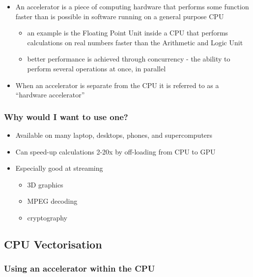 \begin{itemize}
\itemsep1pt\parskip0pt
\item
  An accelerator is a piece of computing hardware that performs some
  function faster than is possible in software running on a general
  purpose CPU

  \begin{itemize}
  \itemsep1pt\parskip0pt
  \item
    an example is the Floating Point Unit inside a CPU that performs
    calculations on real numbers faster than the Arithmetic and Logic
    Unit
  \item
    better performance is achieved through concurrency - the ability to
    perform several operations at once, in parallel
  \end{itemize}
\item
  When an accelerator is separate from the CPU it is referred to as a
  ``hardware accelerator''
\end{itemize}

\subsubsection{Why would I want to use
one?}\label{why-would-i-want-to-use-one}

\begin{itemize}
\itemsep1pt\parskip0pt
\item
  Available on many laptop, desktops, phones, and supercomputers
\item
  Can speed-up calculations 2-20x by off-loading from CPU to GPU
\item
  Especially good at streaming

  \begin{itemize}
  \itemsep1pt\parskip0pt
  \item
    3D graphics
  \item
    MPEG decoding
  \item
    cryptography
  \end{itemize}
\end{itemize}

\subsection{CPU Vectorisation}\label{cpu-vectorisation}

\subsubsection{Using an accelerator within the
CPU}\label{using-an-accelerator-within-the-cpu}

